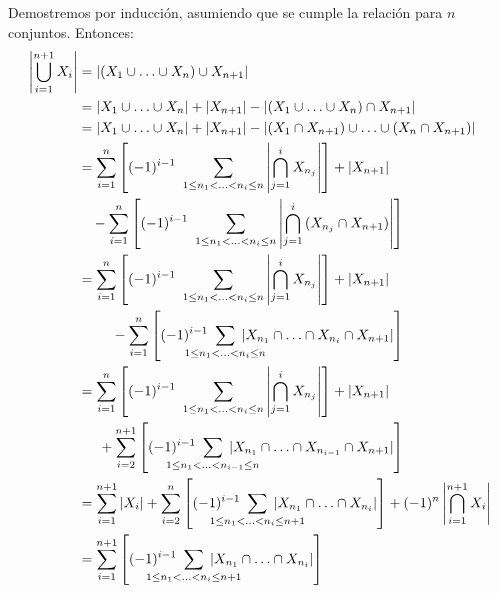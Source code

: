 \begin{enumerate}[a)]
	Demostremos por inducción, asumiendo que se cumple la relación para $n$ conjuntos. Entonces:
	\begin{align*}
		\left|\bigcup_{i=1}^{n+1}{X_i}\right| %
			&= |(X_1\cup\ldots\cup X_n)\cup X_{n+1}|
		\\
			&= |X_1\cup\ldots\cup X_n| + |X_{n+1}| - |(X_1\cup\ldots\cup X_n)\cap X_{n+1}|
		\\
			&= |X_1\cup\ldots\cup X_n| + |X_{n+1}| - |(X_1\cap X_{n+1})\cup\ldots\cup(X_n\cap X_{n+1})|
		\\	&\begin{multlined}
			= \sum_{i=1}^n \left[
				(-1)^{i-1}\ \sum_{{1\leq n_1<\ldots<n_i\leq n}}{\left|\bigcap_{j=1}^{i}{X_{n_j}}\right|}
				\right]
			+ |X_{n+1}|
		\\
			- \sum_{i=1}^n \left[
				(-1)^{i-1}\ \sum_{{1\leq n_1<\ldots<n_i\leq n}}{\left|\bigcap_{j=1}^{i}{(X_{n_j}\cap X_{n+1})}\right|}
				\right]
			\end{multlined}
		\\	&\begin{multlined}
			= \sum_{i=1}^n \left[
				(-1)^{i-1}\ \sum_{{1\leq n_1<\ldots<n_i\leq n}}{\left|\bigcap_{j=1}^{i}{X_{n_j}}\right|}
				\right]
			+ |X_{n+1}|
		\\
			- \sum_{i=1}^n \left[
				(-1)^{i-1}\ \sum_{\mathclap{1\leq n_1<\ldots<n_i\leq n}}\; |X_{n_1}\cap\ldots\cap X_{n_i}\cap X_{n+1}|
				\right]
			\end{multlined}
		\\	&\begin{multlined}
			= \sum_{i=1}^n \left[
				(-1)^{i-1}\ \sum_{{1\leq n_1<\ldots<n_i\leq n}}{\left|\bigcap_{j=1}^{i}{X_{n_j}}\right|}
				\right]
			+ |X_{n+1}|
		\\
			+ \sum_{i=2}^{n+1} \left[
				(-1)^{i-1}\ \sum_{\mathclap{1\leq n_1<\ldots<n_{i-1}\leq n}}\; |X_{n_1}\cap\ldots\cap X_{n_{i-1}}\cap X_{n+1}|
				\right]
			\end{multlined}
		\\
			&= \sum_{i=1}^{n+1} |X_i|
			+ \sum_{i=2}^n \left[
				(-1)^{i-1}\ \sum_{\mathclap{1\leq n_1<\ldots<n_i\leq n+1}}\; |X_{n_1}\cap\ldots\cap X_{n_i}|
				\right]
			+ (-1)^n \left|\bigcap_{i=1}^{n+1}{X_i}\right|
		\\
			&= \sum_{i=1}^{n+1} \left[
				(-1)^{i-1}\ \sum_{\mathclap{1\leq n_1<\ldots<n_i\leq n+1}}\; |X_{n_1}\cap\ldots\cap X_{n_i}|
				\right]
	\end{align*}

\end{enumerate}